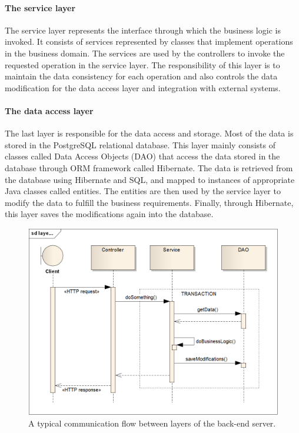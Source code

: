 \documentclass{book}
\begin{document}
\paragraph{The service layer}\label{the-service-layer}

The service layer represents the interface through which the business
logic is invoked. It consists of services represented by classes that
implement operations in the business domain. The services are used by
the controllers to invoke the requested operation in the service layer.
The responsibility of this layer is to maintain the data consistency for
each operation and also controls the data modification for the data
access layer and integration with external systems.

\paragraph{The data access layer}\label{the-data-access-layer}

The last layer is responsible for the data access and storage. Most of
the data is stored in the PostgreSQL relational database. This layer
mainly consists of classes called Data Access Objects (DAO) that access
the data stored in the database through ORM framework called Hibernate.
The data is retrieved from the database using Hibernate and SQL, and
mapped to instances of appropriate Java classes called entities. The
entities are then used by the service layer to modify the data to
fulfill the business requirements. Finally, through Hibernate, this
layer saves the modifications again into the database.


\begin{figure}[h!]
\begin{center}
\includegraphics[width=0.8\columnwidth]{figures/layers/layers}
\caption{A typical communication flow between layers of the back-end server.%
}
\end{center}
\end{figure}
\end{document}
